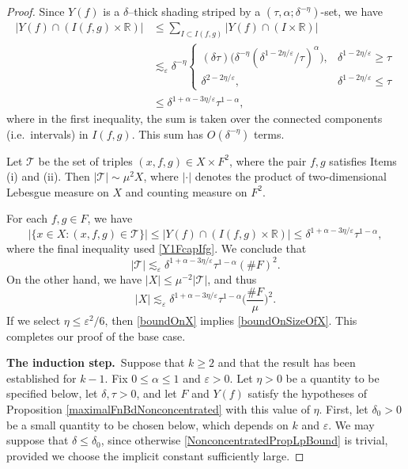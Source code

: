 \documentclass[10pt,a4paper]{amsart}
\newcommand{\RR}{\mathbb{R}}
\newcommand{\eps}{\varepsilon}
\begin{document}
\begin{proof}
Since $Y(f)$ is a $\delta$--thick shading striped by a $(\tau,\alpha;\delta^{-\eta})$-set, we have
\begin{equation}\label{Y1FcapIfg}
\begin{split}
|Y(f) \cap (I(f,g)\times\RR)|& \leq \sum_{I\subset I(f,g)} |Y(f) \cap (I\times\RR)|\\
&\lesssim_\eps \delta^{-\eta} \left\{ \begin{array}{ll} 
(\delta \tau) \big(\delta^{-\eta} (\delta^{1-2\eta/\eps}/\tau)^\alpha\big),& \delta^{1-2\eta/\eps}\geq\tau\\
\delta^{2-2\eta/\eps},& \delta^{1-2\eta/\eps}\leq\tau
\end{array}
\right.\\
&\leq \delta^{1+\alpha-3\eta/\eps}\tau^{1-\alpha},
\end{split}
\end{equation}
where in the first inequality, the sum is taken over the connected components (i.e.~intervals) in $I(f,g)$. This sum has $O(\delta^{-\eta})$ terms.




Let $\mathcal{T}$ be the set of triples $(x, f,g)\in X\times F^2$, where the pair $f,g$ satisfies Items (i) and (ii). Then $|\mathcal{T}|\sim \mu^2 X$, where $|\cdot|$ denotes the product of two-dimensional Lebesgue measure on $X$ and counting measure on $F^2$.

For each $f,g\in F$, we have
\[
|\{x\in X\colon (x, f,g)\in \mathcal{T}\}| \leq  |Y(f) \cap (I(f,g)\times\RR)|\leq \delta^{1+\alpha-3\eta/\eps}\tau^{1-\alpha},
\]
where the final inequality used \eqref{Y1FcapIfg}. We conclude that 
%
\[
|\mathcal{T}|\lesssim_\eps  \delta^{1+\alpha-3\eta/\eps}\tau^{1-\alpha}(\#F)^2.
\]
On the other hand, we have $|X|\leq \mu^{-2}|\mathcal{T}|$, and thus
\begin{equation}\label{boundOnX}
|X|\lesssim_\eps  \delta^{1+\alpha-3\eta/\eps}\tau^{1-\alpha}\Big(\frac{\#F}{\mu}\Big)^2.
\end{equation}
If we select $\eta\leq \eps^2/6$, then \eqref{boundOnX} implies \eqref{boundOnSizeOfX}. This completes our proof of the base case.

\medskip

\noindent \textbf{The induction step.}\ 
Suppose that $k\geq 2$ and that the result has been established for $k-1$. Fix $0\leq\alpha\leq 1$ and $\eps>0$. Let $\eta>0$ be a quantity to be specified below, let $\delta,\tau>0$, and let $F$ and $Y(f)$ satisfy the hypotheses of Proposition \ref{maximalFnBdNonconcentrated} with this value of $\eta$. First, let $\delta_0>0$ be a small quantity to be chosen below, which depends on $k$ and $\eps$. We may suppose that $\delta\leq\delta_0$, since otherwise \eqref{NonconcentratedPropLpBound} is trivial, provided we choose the implicit constant sufficiently large.  


\end{proof}
\end{document}
